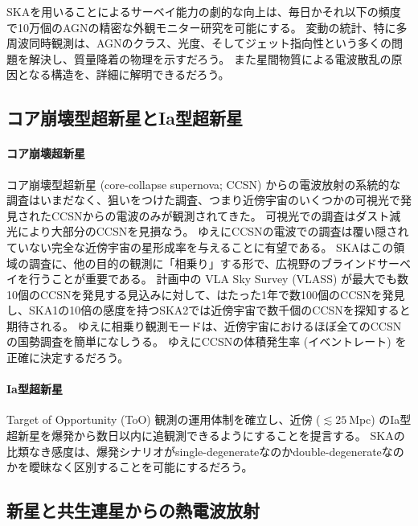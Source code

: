 SKAを用いることによるサーベイ能力の劇的な向上は、毎日かそれ以下の頻度で10万個のAGNの精密な外観モニター研究を可能にする。
変動の統計、特に多周波同時観測は、AGNのクラス、光度、そしてジェット指向性という多くの問題を解決し、質量降着の物理を示すだろう。
また星間物質による電波散乱の原因となる構造を、詳細に解明できるだろう。

\subsection{コア崩壊型超新星とIa型超新星}
\label{c09.s2.ss8}

\paragraph{コア崩壊超新星}

コア崩壊型超新星 (core-collapse supernova; CCSN) からの電波放射の系統的な調査はいまだなく、狙いをつけた調査、つまり近傍宇宙のいくつかの可視光で発見されたCCSNからの電波のみが観測されてきた。
可視光での調査はダスト減光により大部分のCCSNを見損なう。
ゆえにCCSNの電波での調査は覆い隠されていない完全な近傍宇宙の星形成率を与えることに有望である。
SKAはこの領域の調査に、他の目的の観測に「相乗り」する形で、広視野のブラインドサーベイを行うことが重要である。
計画中の VLA Sky Survey (VLASS) が最大でも数10個のCCSNを発見する見込みに対して、はたった1年で数100個のCCSNを発見し、SKA1の10倍の感度を持つSKA2では近傍宇宙で数千個のCCSNを探知すると期待される。
ゆえに相乗り観測モードは、近傍宇宙におけるほぼ全てのCCSNの国勢調査を簡単になしうる。
ゆえにCCSNの体積発生率 (イベントレート) を正確に決定するだろう。

\paragraph{Ia型超新星}

Target of Opportunity (ToO) 観測の運用体制を確立し、近傍 ($\lesssim 25~\text{Mpc}$) のIa型超新星を爆発から数日以内に追観測できるようにすることを提言する。
SKAの比類なき感度は、爆発シナリオがsingle-degenerateなのかdouble-degenerateなのかを曖昧なく区別することを可能にするだろう。

\subsection{新星と共生連星からの熱電波放射}
\label{c09.s2.ss9}


